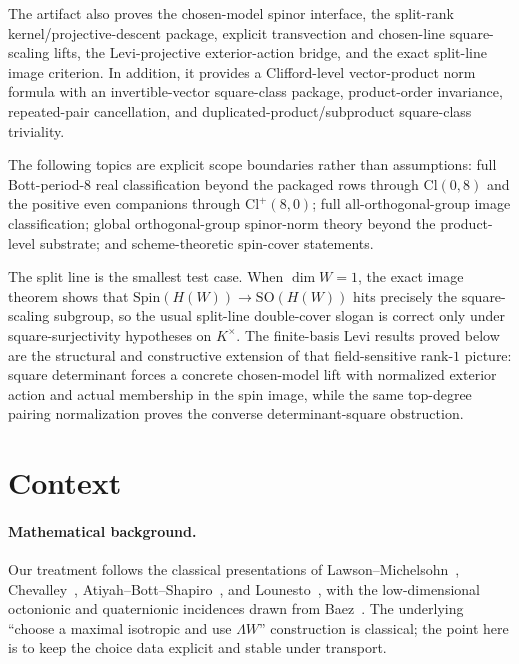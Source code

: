 \documentclass{birkjour}
\theoremstyle{plain}
\theoremstyle{definition}
\theoremstyle{remark}
\newcommand{\Cl}{\mathrm{Cl}}
\newcommand{\Spin}{\mathrm{Spin}}
\newcommand{\SO}{\mathrm{SO}}
\newcommand{\wedgeW}{\Lambda W}
\begin{document}
The artifact also proves the chosen-model spinor interface, the split-rank
kernel/projective-descent package, explicit transvection and chosen-line
square-scaling lifts, the Levi-projective exterior-action bridge, and the exact
split-line image criterion. In addition, it provides a Clifford-level
vector-product norm formula with an invertible-vector square-class package,
product-order invariance, repeated-pair cancellation, and
duplicated-product/subproduct square-class triviality.

The following topics are explicit scope boundaries rather than assumptions:
full Bott-period-$8$ real classification beyond the packaged rows through
$\Cl(0,8)$ and the positive even companions through $\Cl^+(8,0)$; full
all-orthogonal-group image classification; global orthogonal-group spinor-norm
theory beyond the product-level substrate; and scheme-theoretic spin-cover
statements.

The split line is the smallest test case. When $\dim W=1$, the exact image
theorem shows that $\Spin(H(W)) \to \SO(H(W))$ hits precisely the
square-scaling subgroup, so the usual split-line double-cover slogan is correct
only under square-surjectivity hypotheses on $K^\times$. The finite-basis Levi
results proved below are the structural and constructive extension of that
field-sensitive rank-$1$ picture: square determinant forces a concrete
chosen-model lift with normalized exterior action and actual membership in the
spin image, while the same top-degree pairing normalization proves the converse
determinant-square obstruction.

\section{Context}
\label{sec:related}

\paragraph{Mathematical background.} Our treatment follows the classical
presentations of Lawson--Michelsohn~{}\cite{LawsonMichelsohn1989},
Chevalley~{}\cite{Chevalley1996}, Atiyah--Bott--Shapiro~{}\cite{AtiyahBottShapiro1964},
and Lounesto~{}\cite{Lounesto2001}, with the low-dimensional octonionic and
quaternionic incidences drawn from Baez~{}\cite{Baez2002}. The underlying
``choose a maximal isotropic and use $\wedgeW$'' construction is classical;
the point here is to keep the choice data explicit and stable under transport.
\end{document}
